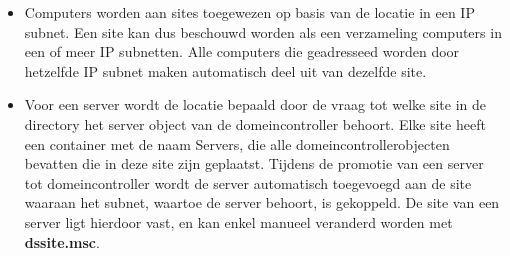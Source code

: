 \begin{enumerate}
		 { 
			\begin{itemize}
				\item Computers worden aan sites toegewezen op basis van de locatie in een IP subnet. Een site kan dus beschouwd worden als een verzameling computers in een of meer IP subnetten. Alle computers die geadresseed worden door hetzelfde IP subnet maken automatisch deel uit van dezelfde site.
				\item Voor een server wordt de locatie bepaald door de vraag tot welke site in de directory het server object van de domeincontroller behoort. Elke site heeft een container met de naam Servers, die alle domeincontrollerobjecten bevatten die in deze site zijn geplaatst. Tijdens de promotie van een server tot domeincontroller wordt de server automatisch toegevoegd aan de site waaraan het subnet, waartoe de server behoort, is gekoppeld. De site van een server ligt hierdoor vast, en kan enkel manueel veranderd worden met \textbf{dssite.msc}.
			\end{itemize}
		}
	\end{enumerate}
	

